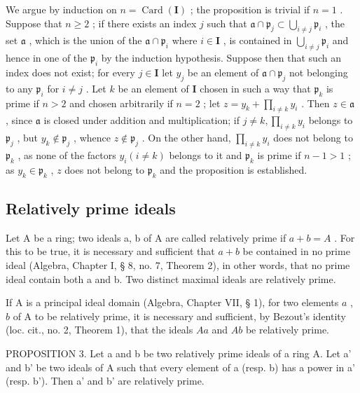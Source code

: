 We argue by induction on \(n = \operatorname{Card}(\mathbf{I})\) ; the proposition is trivial if \(n = 1\) . Suppose that \(n \geqslant 2\) ; if there exists an index \(j\) such that \(\mathfrak{a} \cap \mathfrak{p}_j \subset \bigcup_{i \neq j} \mathfrak{p}_i\) , the set \(\mathfrak{a}\) , which is the union of the \(\mathfrak{a} \cap \mathfrak{p}_i\) where \(i \in \mathbf{I}\) , is contained in \(\bigcup_{i \neq j} \mathfrak{p}_i\) and hence in one of the \(\mathfrak{p}_i\) by the induction hypothesis. Suppose then that such an index does not exist; for every \(j \in \mathbf{I}\) let \(y_j\) be an element of \(\mathfrak{a} \cap \mathfrak{p}_j\) not belonging to any \(\mathfrak{p}_i\) for \(i \neq j\) . Let \(k\) be an element of \(\mathbf{I}\) chosen in such a way that \(\mathfrak{p}_k\) is prime if \(n > 2\) and chosen arbitrarily if \(n = 2\) ; let \(z = y_k + \prod_{i \neq k} y_i\) . Then \(z \in \mathfrak{a}\) , since \(\mathfrak{a}\) is closed under addition and multiplication; if \(j \neq k, \prod_{i \neq k} y_i\) belongs to \(\mathfrak{p}_j\) , but \(y_k \notin \mathfrak{p}_j\) , whence \(z \notin \mathfrak{p}_j\) . On the other hand, \(\prod_{i \neq k} y_i\) does not belong to \(\mathfrak{p}_k\) , as none of the factors \(y_i (i \neq k)\) belongs to it and \(\mathfrak{p}_k\) is prime if \(n - 1 > 1\) ; as \(y_k \in \mathfrak{p}_k\) , \(z\) does not belong to \(\mathfrak{p}_k\) and the proposition is established.

\subsection{Relatively prime ideals}

Let A be a ring; two ideals a, b of A are called relatively prime if \(a + b = A\) . For this to be true, it is necessary and sufficient that \(a + b\) be contained in no prime ideal (Algebra, Chapter I, § 8, no. 7, Theorem 2), in other words, that no prime ideal contain both a and b. Two distinct maximal ideals are relatively prime.

If A is a principal ideal domain (Algebra, Chapter VII, § 1), for two elements \(a\) , \(b\) of A to be relatively prime, it is necessary and sufficient, by Bezout's identity (loc. cit., no. 2, Theorem 1), that the ideals \(Aa\) and \(Ab\) be relatively prime.

PROPOSITION 3. Let a and b be two relatively prime ideals of a ring A. Let a' and b' be two ideals of A such that every element of a (resp. b) has a power in a' (resp. b'). Then a' and b' are relatively prime.

